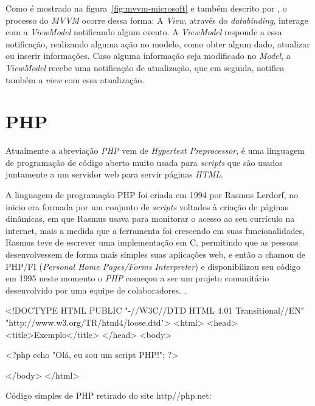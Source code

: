 Como é mostrado na figura~\ref{fig:mvvm-microsoft} e também descrito por , o processo do \textit{MVVM} ocorre dessa forma: A \textit{View}, através do \textit{databinding}, interage com a \textit{ViewModel} notificando algum evento. A \textit{ViewModel} responde a essa notificação, realizando alguma ação no modelo, como obter algum dado, atualizar ou inserir informações. Caso alguma informação seja modificado no \textit{Model}, a \textit{ViewModel} recebe uma notificação de atualização, que em seguida, notifica também a \textit{view} com essa atualização.

\section{PHP}
\label{sec:php}

Atualmente a abreviação \textit{PHP} vem de \textit{Hypertext Preprocessor}, é uma linguagem de programação de código aberto muito usada para \textit{scripts} que são usados juntamente a um servidor web para servir páginas \textit{HTML}.

A linguagem de programação PHP foi criada em 1994 por Rasmus Lerdorf, no inicio era formada por um conjunto de \textit{scripts} voltados à criação de páginas dinâmicas, em que Rasmus usava para monitorar o acesso ao seu currículo na internet, mais a medida que a ferramenta foi crescendo em suas funcionalidades, Rasmus teve de escrever uma implementação em C, permitindo que as pessoas desenvolvessem de forma mais simples suas aplicações web, e então a chamou de PHP/FI (\textit{Personal Home Pages/Forms Interpreter}) e disponibilizou seu código em 1995 neste momento o \textit{PHP} começou a ser um projeto comunitário desenvolvido por uma equipe de colaboradores. \cite[p.~20]{pablo-php}.

\begin{listing}
    \begin{phpcode}
    <!DOCTYPE HTML PUBLIC "-//W3C//DTD HTML 4.01 Transitional//EN"
    "http://www.w3.org/TR/html4/loose.dtd">
    <html>
        <head>
            <title>Exemplo</title>
        </head>
        <body>

        <?php
            echo "Olá, eu sou um script PHP!";
        ?>

        </body>
    </html>
    \end{phpcode}
    \caption{Código simples de PHP retirado do site http//php.net:}
    \label{lst:php_example_1}
\end{listing}

